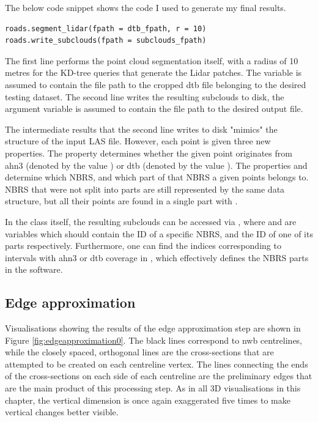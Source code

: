 The below code snippet shows the code I used to generate my final results.

\begin{verbatim}
roads.segment_lidar(fpath = dtb_fpath, r = 10)
roads.write_subclouds(fpath = subclouds_fpath)
\end{verbatim}

The first line performs the point cloud segmentation itself, with a radius of 10 metres for the KD-tree queries that generate the Lidar patches. The variable  is assumed to contain the file path to the cropped \ac{dtb} file belonging to the desired testing dataset. The second line writes the resulting subclouds to disk, the argument variable is assumed to contain the file path to the desired output file.

The intermediate results that the second line writes to disk "mimics" the structure of the input LAS file. However, each point is given three new properties. The property  determines whether the given point originates from \ac{ahn3} (denoted by the value ) or \ac{dtb} (denoted by the value ). The properties  and  determine which NBRS, and which part of that NBRS a given points belongs to. NBRS that were not split into parts are still represented by the same data structure, but all their points are found in a single part with .

In the class itself, the resulting subclouds can be accessed via , where  and  are variables which should contain the ID of a specific NBRS, and the ID of one of its parts respectively. Furthermore, one can find the indices corresponding to intervals with \ac{ahn3} or \ac{dtb} coverage in , which effectively defines the NBRS parts in the software.

\subsection{Edge approximation}
\label{sub:r_edgeapproximation}

Visualisations showing the results of the edge approximation step are shown in Figure \ref{fig:edgeapproximation0}. The black lines correspond to \ac{nwb} centrelines, while the closely spaced, orthogonal lines are the cross-sections that are attempted to be created on each centreline vertex. The lines connecting the ends of the cross-sections on each side of each centreline are the preliminary edges that are the main product of this processing step. As in all 3D visualisations in this chapter, the vertical dimension is once again exaggerated five times to make vertical changes better visible.

